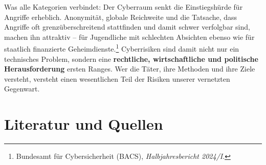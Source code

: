 \documentclass[
  nswissgerman,
  a4paper,
  DIV=11,
  numbers=noendperiod,
  ngerman]{scrreprt}
\begin{document}
Was alle Kategorien verbindet: Der Cyberraum senkt die Einstiegshürde
für Angriffe erheblich. Anonymität, globale Reichweite und die Tatsache,
dass Angriffe oft grenzüberschreitend stattfinden und damit schwer
verfolgbar sind, machen ihn attraktiv -- für Jugendliche mit schlechten
Absichten ebenso wie für staatlich finanzierte Geheimdienste.\footnote{Bundesamt
  für Cybersicherheit (BACS), \emph{Halbjahresbericht 2024/{I}}.}
Cyberrisiken sind damit nicht nur ein technisches Problem, sondern eine
\textbf{rechtliche, wirtschaftliche und politische Herausforderung}
ersten Ranges. Wer die Täter, ihre Methoden und ihre Ziele versteht,
versteht einen wesentlichen Teil der Risiken unserer vernetzten
Gegenwart.

\section*{Literatur und Quellen}\label{literatur-und-quellen}

\end{document}
